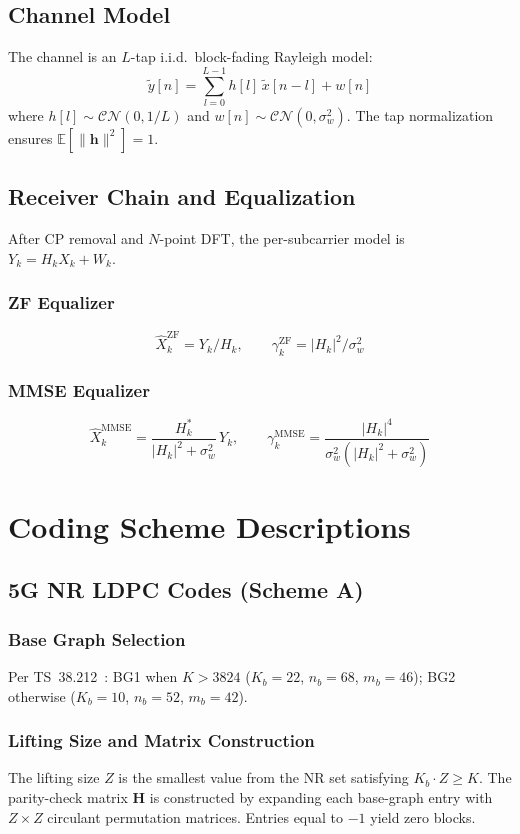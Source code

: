 \documentclass[12pt, a4paper]{article}
\begin{document}
\subsection{Channel Model}
The channel is an $L$-tap i.i.d.\ block-fading Rayleigh model:
\begin{equation}
\tilde{y}[n] = \sum_{l=0}^{L-1} h[l]\,\tilde{x}[n-l] + w[n]
\end{equation}
where $h[l] \sim \mathcal{CN}(0,1/L)$ and $w[n]\sim\mathcal{CN}(0,\sigma_w^2)$. The tap normalization ensures $\mathbb{E}[\|\mathbf{h}\|^2]=1$.

\subsection{Receiver Chain and Equalization}
After CP removal and $N$-point DFT, the per-subcarrier model is $Y_k = H_k X_k + W_k$.

\subsubsection{ZF Equalizer}
$$\hat{X}_k^{\text{ZF}} = Y_k / H_k, \qquad \gamma_k^{\text{ZF}} = |H_k|^2/\sigma_w^2$$

\subsubsection{MMSE Equalizer}
$$\hat{X}_k^{\text{MMSE}} = \frac{H_k^*}{|H_k|^2+\sigma_w^2}\,Y_k, \qquad \gamma_k^{\text{MMSE}} = \frac{|H_k|^4}{\sigma_w^2(|H_k|^2+\sigma_w^2)}$$

\section{Coding Scheme Descriptions}
\subsection{5G NR LDPC Codes (Scheme A)}

\subsubsection{Base Graph Selection}
Per TS~38.212~\cite{3gpp_212}: BG1 when $K>3824$ ($K_b\!=\!22$, $n_b\!=\!68$, $m_b\!=\!46$); BG2 otherwise ($K_b\!=\!10$, $n_b\!=\!52$, $m_b\!=\!42$).

\subsubsection{Lifting Size and Matrix Construction}
The lifting size $Z$ is the smallest value from the NR set satisfying $K_b\cdot Z \geq K$. The parity-check matrix $\mathbf{H}$ is constructed by expanding each base-graph entry with $Z\times Z$ circulant permutation matrices. Entries equal to $-1$ yield zero blocks.
\end{document}
